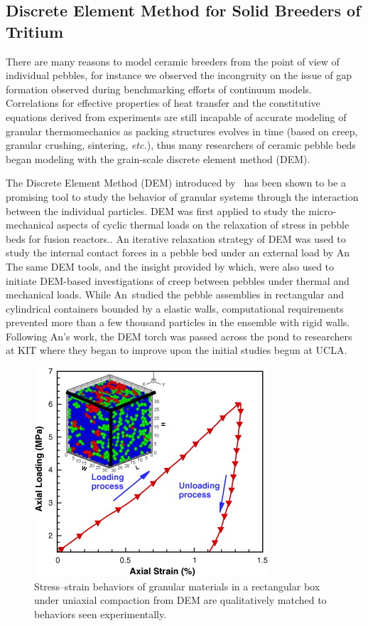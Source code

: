 \subsection{Discrete Element Method for Solid Breeders of Tritium}
There are many reasons to model ceramic breeders from the point of view of individual pebbles, for instance we observed the incongruity on the issue of gap formation observed during benchmarking efforts of continuum models. Correlations for effective properties of heat transfer and the constitutive equations derived from experiments are still incapable of accurate modeling of granular thermomechanics as packing structures evolves in time (based on creep, granular crushing, sintering, \textit{etc.}), thus many researchers of ceramic pebble beds began modeling with the grain-scale discrete element method (DEM).

The Discrete Element Method (DEM) introduced by~\cite{Cundall1979} has been shown to be a promising tool to study the behavior of granular systems through the interaction between the individual particles. DEM was first applied to study the micro-mechanical aspects of cyclic thermal loads on the relaxation of stress in pebble beds for fusion reactors.\cite{Lu2000b,Ying2002}. An iterative relaxation strategy of DEM was used to study the internal contact forces in a pebble bed under an external load by An\etal\cite{An20072233} The same DEM tools, and the insight provided by which, were also used to initiate DEM-based investigations of creep between pebbles under thermal and mechanical loads.\cite{An20071393} While An\etal~studied the pebble assemblies in rectangular and cylindrical containers bounded by a elastic walls, computational requirements prevented more than a few thousand particles in the ensemble with rigid walls.\cite{An20072233} Following An's work, the DEM torch was passed across the pond to researchers at KIT where they began to improve upon the initial studies begun at UCLA.

\begin{figure}[!ht]
    \centering
    \includegraphics[width=\singleimagewidth]{figures/1-s2.0-S092037960700049X-gr1.jpg}
    \caption{Stress–strain behaviors of granular materials in a rectangular box under uniaxial compaction from DEM are qualitatively matched to behaviors seen experimentally.}
\label{fig:an-uniaxial-compression}
\end{figure}

